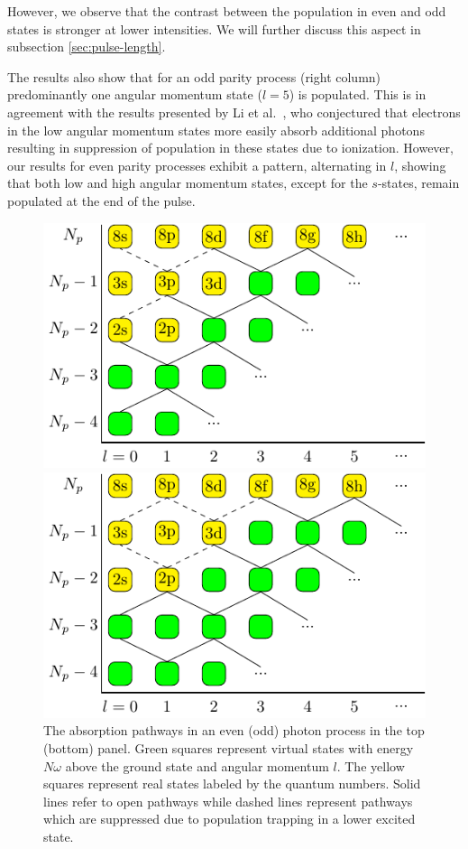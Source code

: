 However, we observe that the contrast between the population in even and odd states is stronger at lower intensities. We will further discuss this aspect in subsection \ref{sec:pulse-length}.  

The results also show that for an odd parity process (right column) predominantly one angular momentum state ($l=5$) is populated. This is in agreement with the results presented by Li et al.\ \cite{li2014b}, who conjectured that electrons in the low angular momentum states more easily absorb additional photons resulting in suppression of population in these states due to ionization. However, our results for even parity processes exhibit a pattern, alternating in $l$, showing that both low and high angular momentum states, except for the $s$-states, remain populated at the end of the pulse. 

\begin{figure}[!ht]
\centering
\includegraphics[width=0.8\columnwidth]{figs/Rydberg/l_fig_even.pdf}

\vspace*{0.5cm}

\includegraphics[width=0.8\columnwidth]{figs/Rydberg/l_fig_odd.pdf}
\caption{
The absorption pathways in an even (odd) photon process in the top (bottom) panel. Green squares represent virtual states with energy $N\omega$ above the ground state and angular momentum $l$. The yellow squares represent real states labeled by the quantum numbers. Solid lines refer to open pathways while dashed lines represent pathways which are suppressed due to population trapping in a lower excited state.
}
\label{fig:pathways_ryd_linear}
\end{figure}

